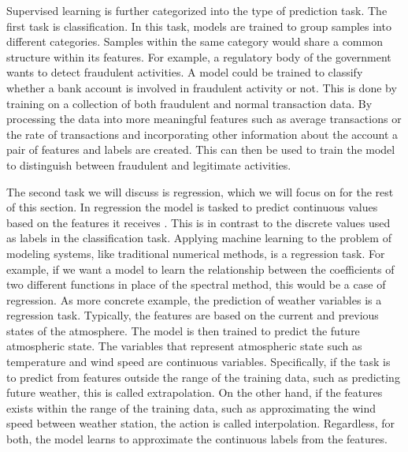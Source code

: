 Supervised learning is further categorized into the type of prediction task. The first task is classification. In this task, models are trained to group samples into different categories. Samples within the same category would share a common structure within its features. For example, a regulatory body of the government wants to detect fraudulent activities. A model could be trained to classify whether a bank account is involved in fraudulent activity or not. This is done by training on a collection of both fraudulent and normal transaction data. By processing the data into more meaningful features such as average transactions or the rate of transactions and incorporating other information about the account a pair of features and labels are created. This can then be used to train the model to distinguish between fraudulent and legitimate activities.

The second task we will discuss is regression, which we will focus on for the rest of this section. In regression the model is tasked to predict continuous values based on the features it receives \autocite{alpaydinIntroductionMachineLearning2020,matloffStatisticalRegressionClassification2017}. This is in contrast to the discrete values used as labels in the classification task. Applying machine learning to the problem of modeling systems, like traditional numerical methods, is a regression task. For example, if we want a model to learn the relationship between the coefficients of two different functions in place of the spectral method, this would be a case of regression. As more concrete example, the prediction of weather variables is a regression task. Typically, the features are based on the current and previous states of the atmosphere. The model is then trained to predict the future atmospheric state. The variables that represent atmospheric state such as temperature and wind speed are continuous variables. Specifically, if the task is to predict from features outside the range of the training data, such as predicting future weather, this is called extrapolation. On the other hand, if the features exists within the range of the training data, such as approximating the wind speed between weather station, the action is called interpolation. Regardless, for both, the model learns to approximate the continuous labels from the features.

